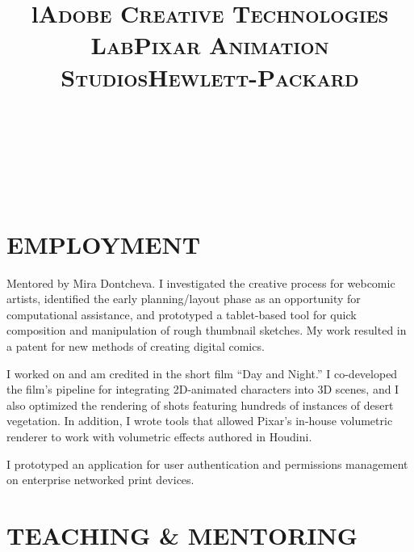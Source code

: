 \documentclass[line,margin]{res}
\begin{document}
\begin{resume}


\begin{format}
\\
\title{l}\\
\body\\
\end{format}


\section{EMPLOYMENT}

\title{\textsc{Adobe Creative Technologies Lab}}
\begin{position}
Mentored by Mira Dontcheva. I investigated the creative process for webcomic artists, identified the early planning/layout phase as an opportunity for computational assistance, and prototyped a tablet-based tool for quick composition and manipulation of rough thumbnail sketches. My work resulted in a patent for new methods of creating digital comics.
\end{position}

\title{\textsc{Pixar Animation Studios}}
\begin{position}
I worked on and am credited in the short film ``Day and Night.'' I co-developed the film's pipeline for integrating 2D-animated characters into 3D scenes, and I also optimized the rendering of shots featuring hundreds of instances of desert vegetation. In addition, I wrote tools that allowed Pixar's in-house volumetric renderer to work with volumetric effects authored in Houdini.
\end{position}

\title{\textsc{Hewlett-Packard}}
\begin{position}
I prototyped an application for user authentication and permissions management on enterprise networked print devices.
\end{position}


\section{TEACHING \& MENTORING}


\end{resume}
\end{document}
